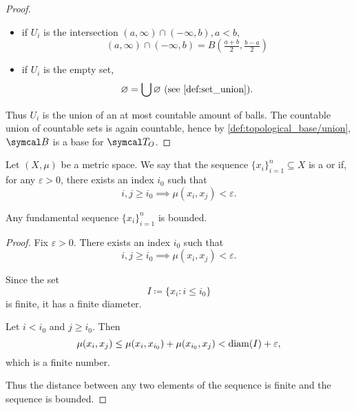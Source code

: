 \begin{proof}
\begin{itemize}
    \item if \( U_i \) is the intersection \( (a, \infty) \cap (-\infty, b), a < b \),
    \begin{equation*}
      (a, \infty) \cap (-\infty, b) = B(\tfrac {a + b} 2, \tfrac {b - a} 2)
    \end{equation*}

    \item if \( U_i \) is the empty set,
    \begin{equation*}
      \varnothing = \bigcup \varnothing \text{ (see \cref{def:set_union})}.
    \end{equation*}
  \end{itemize}

  Thus \( U_i \) is the union of an at most countable amount of balls. The countable union of countable sets is again countable, hence by \cref{def:topological_base/union}, \( \Cal{B} \) is a base for \( \Cal{T}_O \).
\end{proof}

\begin{definition}\label{def:fundamental_sequence}
  Let \( (X, \mu) \) be a metric space. We say that the sequence \( \{ x_i \}_{i=1}^n \subseteq X \) is a  or  if, for any \( \varepsilon > 0 \), there exists an index \( i_0 \) such that
  \begin{equation*}
    i, j \geq i_0 \implies \mu(x_i, x_j) < \varepsilon.
  \end{equation*}
\end{definition}

\begin{proposition}\label{thm:fundamental_sequence_is_bounded}
  Any fundamental sequence \( \{ x_i \}_{i=1}^n \) is bounded.
\end{proposition}
\begin{proof}
  Fix \( \varepsilon > 0 \). There exists an index \( i_0 \) such that
  \begin{equation*}
    i, j \geq i_0 \implies \mu(x_i, x_j) < \varepsilon.
  \end{equation*}

  Since the set
  \begin{equation*}
    I \coloneqq \{ x_i \colon i \leq i_0 \}
  \end{equation*}
  is finite, it has a finite diameter.

  Let \( i < i_0 \) and \( j \geq i_0 \). Then
  \begin{equation*}
    \mu(x_i, x_j) \leq \mu(x_i, x_{i_0}) + \mu(x_{i_0}, x_j) < \operatorname{diam}(I) + \varepsilon,
  \end{equation*}
  which is a finite number.

  Thus the distance between any two elements of the sequence is finite and the sequence is bounded.
\end{proof}

